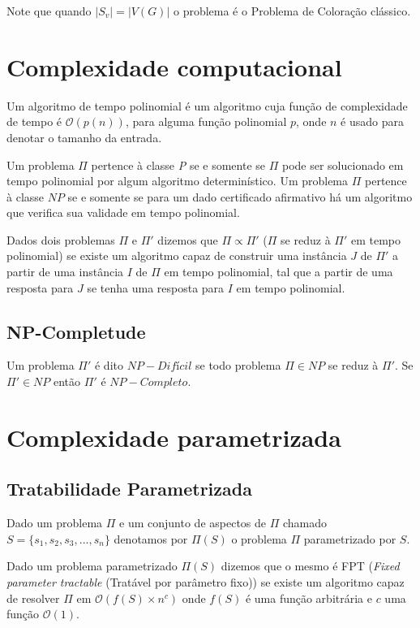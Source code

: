 Note que quando $|S_v|=|V(G)|$ o problema é o Problema de Coloração clássico.

\section{Complexidade computacional}

Um algoritmo de tempo polinomial é um algoritmo cuja função de complexidade de tempo é $\mathcal{O}(p(n))$, para alguma função polinomial $p$, onde $n$ é usado para denotar o tamanho da entrada.

Um problema $\Pi$ pertence à classe \emph{P} se e somente se $\Pi$ pode ser solucionado em tempo polinomial por algum algoritmo determinístico. Um problema $\Pi$ pertence à classe $\textit{NP}$ se e somente se para um dado certificado afirmativo há um algoritmo que verifica sua validade em tempo polinomial.

Dados dois problemas $\Pi$ e $\Pi'$ dizemos que $\Pi \propto \Pi'$ ($\Pi$ se reduz à $\Pi'$ em tempo polinomial) se existe um algoritmo capaz de construir uma instância $J$ de $\Pi'$ a partir de uma instância $I$ de $\Pi$ em tempo polinomial, tal que a partir de uma resposta para $J$ se tenha uma resposta para $I$ em tempo polinomial. 

\subsection{NP-Completude}
Um problema $\Pi'$ é dito $NP-Difícil$ se todo problema $\Pi \in NP$ se reduz à $\Pi'$. Se $\Pi' \in NP$ então $\Pi'$ é $NP-Completo$.

\section{Complexidade parametrizada}

\subsection{Tratabilidade Parametrizada}
\begin{definition}
Dado um problema $\Pi$ e um conjunto de aspectos de $\Pi$ chamado $S = \{s_1,s_2,s_3,...,s_n\}$ denotamos por $\Pi(S)$ o problema $\Pi$ parametrizado por $S$.
\end{definition}
\begin{definition}
Dado um problema parametrizado $\Pi(S)$ dizemos que o mesmo é FPT (\emph{Fixed parameter tractable} (Tratável por parâmetro fixo)) se existe um algoritmo capaz de resolver $\Pi$ em $\mathcal{O}(f(S)\times n^c)$ onde $f(S)$ é uma função arbitrária e $c$ uma função $\mathcal{O}(1)$.
\end{definition}

